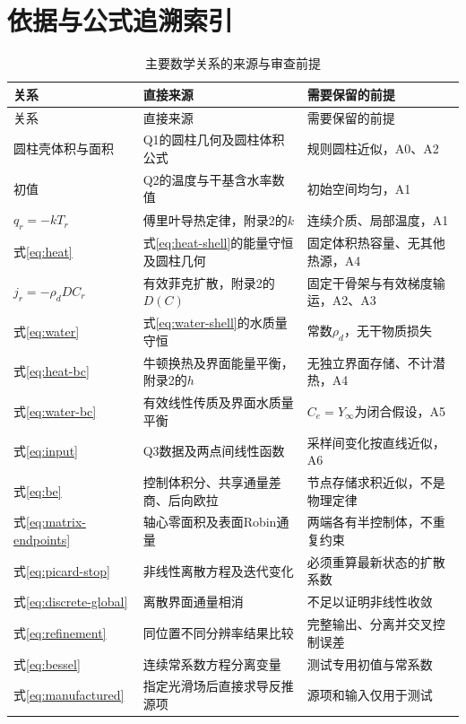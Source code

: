 \documentclass[UTF8,a4paper,zihao=-4,fontset=none]{ctexart}
\numberwithin{equation}{section}
\begin{document}
\section{依据与公式追溯索引}
\begin{longtable}{@{}>{\raggedright\arraybackslash}p{}>{\raggedright\arraybackslash}p{}>{\raggedright\arraybackslash}p{}@{}}
\caption{主要数学关系的来源与审查前提}\label{tab:trace}\\
\toprule
关系 & 直接来源 & 需要保留的前提\\
\midrule
\endfirsthead
\toprule
关系 & 直接来源 & 需要保留的前提\\
\midrule
\endhead
圆柱壳体积与面积 & Q1的圆柱几何及圆柱体积公式 & 规则圆柱近似，A0、A2\\
初值 & Q2的温度与干基含水率数值 & 初始空间均匀，A1\\
$q_r=-kT_r$ & 傅里叶导热定律，附录2的$k$ & 连续介质、局部温度，A1\\
式\eqref{eq:heat} & 式\eqref{eq:heat-shell}的能量守恒及圆柱几何 & 固定体积热容量、无其他热源，A4\\
$j_r=-\rho_dD C_r$ & 有效菲克扩散，附录2的$D(C)$ & 固定干骨架与有效梯度输运，A2、A3\\
式\eqref{eq:water} & 式\eqref{eq:water-shell}的水质量守恒 & 常数$\rho_d$，无干物质损失\\
式\eqref{eq:heat-bc} & 牛顿换热及界面能量平衡，附录2的$h$ & 无独立界面存储、不计潜热，A4\\
式\eqref{eq:water-bc} & 有效线性传质及界面水质量平衡 & $C_e=Y_\infty$为闭合假设，A5\\
式\eqref{eq:input} & Q3数据及两点间线性函数 & 采样间变化按直线近似，A6\\
式\eqref{eq:be} & 控制体积分、共享通量差商、后向欧拉 & 节点存储求积近似，不是物理定律\\
式\eqref{eq:matrix-endpoints} & 轴心零面积及表面Robin通量 & 两端各有半控制体，不重复约束\\
式\eqref{eq:picard-stop} & 非线性离散方程及迭代变化 & 必须重算最新状态的扩散系数\\
式\eqref{eq:discrete-global} & 离散界面通量相消 & 不足以证明非线性收敛\\
式\eqref{eq:refinement} & 同位置不同分辨率结果比较 & 完整输出、分离并交叉控制误差\\
式\eqref{eq:bessel} & 连续常系数方程分离变量 & 测试专用初值与常系数\\
式\eqref{eq:manufactured} & 指定光滑场后直接求导反推源项 & 源项和输入仅用于测试\\
\bottomrule
\end{longtable}
\end{document}
